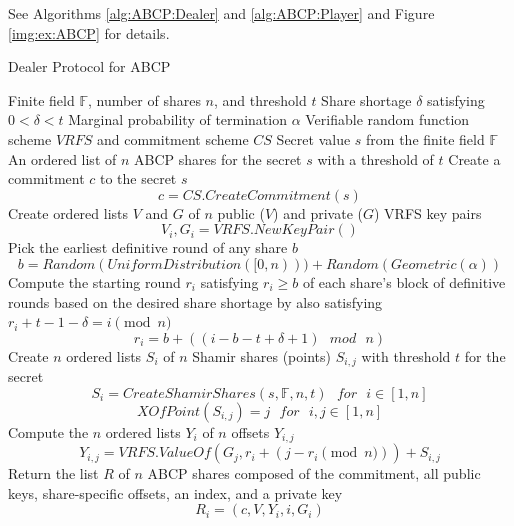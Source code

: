 \documentclass{dalcsthesis}
\begin{document}
See Algorithms \ref{alg:ABCP:Dealer} and \ref{alg:ABCP:Player} and Figure \ref{img:ex:ABCP} for details.

\begin{algorithm}
  \caption{Dealer Protocol for ABCP}
  \label{alg:ABCP:Dealer}
  \begin{algorithmic}
    \INPUT Finite field $\mathbb{F}$, number of shares $n$, and threshold $t$
    \INPUT Share shortage $\delta$ satisfying $0 < \delta < t$
    \INPUT Marginal probability of termination $\alpha$
    \INPUT Verifiable random function scheme $VRFS$ and commitment scheme $CS$
    \INPUT Secret value $s$ from the finite field $\mathbb{F}$
    \OUTPUT An ordered list of $n$ ABCP shares for the secret $s$ with a threshold of $t$
    \STATE Create a commitment $c$ to the secret $s$
    	$$c = CS.CreateCommitment(s)$$
    \STATE Create ordered lists $V$ and $G$ of $n$ public ($V$) and private ($G$) VRFS key pairs
    	$$V_i, G_i = VRFS.NewKeyPair()$$
    \STATE Pick the earliest definitive round of any share $b$ 
	    $$b = Random(UniformDistribution([0,n))) + Random(Geometric(\alpha))$$
    \STATE Compute the starting round $r_i$ satisfying $r_i \geq b$ of each share's block of definitive rounds based on the desired share shortage by also satisfying $r_i + t - 1 - \delta = i \pmod{n}$
  	    $$r_i = b + ((i-b-t+\delta+1) \text{ } mod \text{ } n)$$
    \STATE Create $n$ ordered lists $S_i$ of $n$ Shamir shares (points) $S_{i,j}$ with threshold $t$ for the secret
  	    $$S_i = CreateShamirShares(s, \mathbb{F}, n, t) \text{ } for \text{ } i \in [1, n]$$
  	    $$XOfPoint(S_{i,j}) = j \text{ } for \text{ } i,j \in [1, n]$$
    \STATE Compute the $n$ ordered lists $Y_i$ of $n$ offsets $Y_{i,j}$
  	    $$Y_{i,j} = VRFS.ValueOf(G_j, r_i + (j-r_i \pmod{n})) + S_{i,j}$$
    \STATE Return the list $R$ of $n$ ABCP shares composed of the commitment, all public keys, share-specific offsets, an index, and a private key
    	$$R_i = (c, V, Y_i, i, G_i)$$
  \end{algorithmic}
\end{algorithm}
\end{document}
